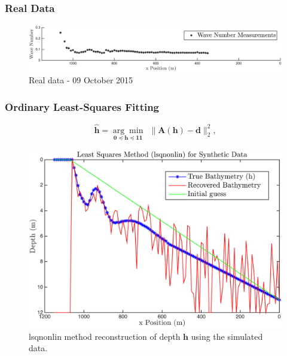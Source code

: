 \subsubsection{Real Data}
\begin{figure}[H]
\center
\includegraphics[scale=0.5]{img/real_data_k_Oct09.png} 
\caption{Real data - 09 October 2015}
\label{RealData_oct09}
\end{figure}




\subsubsection{Ordinary Least-Squares Fitting}

\begin{equation}\label{LS-BC}
\mathbf{\hat{h}}= \underset{\mathbf{0} \preceq \mathbf{h} \preceq \mathbf{11} }{\arg \min} \ \  \|  \mathbf{A}(\mathbf{h}) -  \mathbf{d} \|_2^2,
\end{equation}

\begin{figure}[H]
\center
\includegraphics[scale=0.6]{img/lsqnonlin_simulated_10m.png} %
\caption{lsqnonlin method reconstruction of depth $\mathbf{h}$ using the simulated data.}
\label{fmincon_simulated}
\end{figure}

